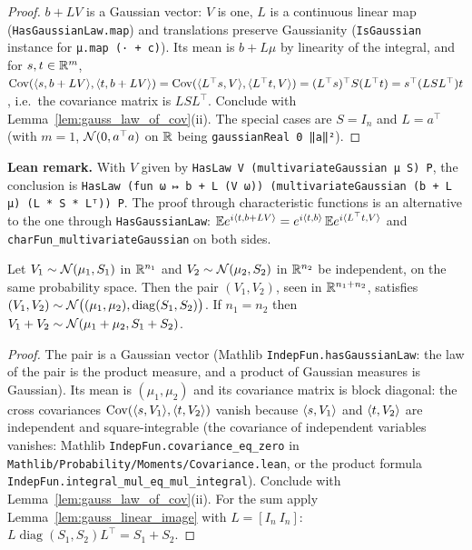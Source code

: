 \begin{proof}
$b + LV$ is a Gaussian vector: $V$ is one, $L$ is a continuous linear map
(\texttt{HasGaussianLaw.map}) and translations preserve Gaussianity
(\texttt{IsGaussian} instance for \texttt{μ.map (· + c)}). Its mean is $b + L\mu$ by
linearity of the integral, and for $s, t \in \mathbb{R}^m$,
$\operatorname{Cov}(\langle s, b + LV \rangle, \langle t, b+LV \rangle) = \operatorname{Cov}(\langle L^\top s, V \rangle,
\langle L^\top t, V \rangle) = (L^\top s)^\top S (L^\top t) = s^\top (LSL^\top) t$, i.e.\ the covariance
matrix is $LSL^\top$. Conclude with Lemma~\ref{lem:gauss_law_of_cov}(ii). The special cases
are $S = I_n$ and $L = a^\top$ (with $m = 1$, $\mathcal{N}(0, a^\top a)$ on $\mathbb{R}$ being
\texttt{gaussianReal 0 ‖a‖²}).
\end{proof}

\textbf{Lean remark.} With $V$ given by \texttt{HasLaw V (multivariateGaussian μ S) P}, the
conclusion is \texttt{HasLaw (fun ω ↦ b + L (V ω)) (multivariateGaussian (b + L μ) (L * S * Lᵀ)) P}.
The proof through characteristic functions is an alternative to the one through
\texttt{HasGaussianLaw}: $\mathbb{E} e^{i\langle t, b + LV \rangle} = e^{i\langle t, b \rangle}\,\mathbb{E} e^{i\langle L^\top t, V \rangle}$
and \texttt{charFun\_multivariateGaussian} on both sides.

\begin{lemma}\label{lem:pg_indep_gaussian_pair}
Let $V_1 \sim \mathcal{N}(\mu_1, S_1)$ in $\mathbb{R}^{n_1}$ and $V_2 \sim \mathcal{N}(\mu_2, S_2)$ in
$\mathbb{R}^{n_2}$ be independent, on the same probability space. Then the pair $(V_1, V_2)$, seen in
$\mathbb{R}^{n_1 + n_2}$, satisfies
$(V_1,V_2) \sim \mathcal{N}\big((\mu_1,\mu_2), \operatorname{diag}(S_1, S_2)\big)$.
If $n_1 = n_2$ then $V_1 + V_2 \sim \mathcal{N}(\mu_1 + \mu_2, S_1 + S_2)$.
\end{lemma}

\begin{proof}
The pair is a Gaussian vector (Mathlib \texttt{IndepFun.hasGaussianLaw}: the law of the pair
is the product measure, and a product of Gaussian measures is Gaussian). Its mean is
$(\mu_1,\mu_2)$ and its covariance matrix is block diagonal: the cross covariances
$\operatorname{Cov}(\langle s, V_1 \rangle, \langle t, V_2 \rangle)$ vanish because $\langle s, V_1 \rangle$ and $\langle t, V_2 \rangle$
are independent and square-integrable (the covariance of independent variables vanishes:
Mathlib \texttt{IndepFun.covariance\_eq\_zero} in \texttt{Mathlib/Probability/Moments/Covariance.lean},
or the product formula \texttt{IndepFun.integral\_mul\_eq\_mul\_integral}). Conclude with
Lemma~\ref{lem:gauss_law_of_cov}(ii). For the sum apply Lemma~\ref{lem:gauss_linear_image}
with $L = [I_n\ I_n]$: $L\operatorname{diag}(S_1,S_2)L^\top = S_1 + S_2$.
\end{proof}

